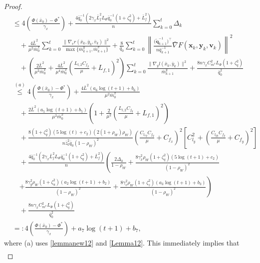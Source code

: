 \documentclass{article}
\theoremstyle{plain}
\theoremstyle{definition}
\theoremstyle{remark}
\begin{document}
\begin{proof}
\begin{align}
&\leq4\left(\frac{\Phi(\bar{x}_{0})-\Phi^*}{\gamma_x}\right)+\frac{4\bar{q}_{0}^{-1}(2\gamma_x \bar{L}_{f}^2L_\Phi \bar{q}_0^{-1} \left(1 +\zeta_q^2\right)+\bar{L}_f^2)}{n}\sum_{k=0}^t \Delta_k\nonumber\\
&\quad + \frac{4\bar{L}^2}{\mu^2\bar{m}^x_{0}}\sum_{k=0}^t \frac{\|\nabla_v r(\bar{x}_k, \bar{y}_k, \bar{v}_k)\|^2}{\max\{\bar{m}^y_{k+1},\bar{m}^v_{k+1}\}}+ \frac{8}{\bar{q}_{0}}\sum_{k=0}^t \left\| \frac{\big(\tilde{\mathbf{q}}_{k+1}^{-1}\big)^\top}{n\bar{q}_{k+1}^{-1}} \bar{\nabla} F(\mathbf{x}_k, \mathbf{y}_k, \mathbf{v}_k) \right\|^2 \nonumber\\
&\quad+ \left( \frac{2\bar{L}^2}{\mu^2\bar{m}^x_{0}} + \frac{4\bar{L}^2}{\mu^4\bar{m}^x_{0}} \left( \frac{L_{l,2} C_{f_y}}{\mu} + L_{f,1} \right)^2 \right)\sum_{k=0}^t \frac{\|\nabla_y l(\bar{x}_k, \bar{y}_k)\|^2}{\bar{m}^y_{k+1}}+\frac{8n\gamma_x C_{m^x}^2 L_\Phi \left(1 +\zeta_q^2\right)}{\bar{q}_0^2}\nonumber\\
&\overset{(a)}{\leq}4\left(\frac{\Phi(\bar{x}_{0})-\Phi^*}{\gamma_x}\right)+ \frac{4\bar{L}^2(a_6\log(t + 1)+b_6) }{\mu^2\bar{m}^x_{0}}\nonumber\\
&\quad+\frac{2\bar{L}^2(a_5\log(t + 1)+b_5)}{\mu^2\bar{m}^x_{0}} \left( 1 + \frac{2}{\mu^2} \left( \frac{L_{l,2} C_{f_y}}{\mu} + L_{f,1} \right)^2 \right)\nonumber\\
&\quad + \frac{8(1+\zeta_q^2)(5 \log(t) + c_2)(2(1 + \rho_W) \rho_W)}{n\bar{z}_0^2\bar{q}_0(1 - \rho_W)^2}\left(\frac{C_{l_{xy}}C_{f_y}}{\mu}\!+\!C_{f_x}\right)^2\!\left[\!C_{l_y}^2\!+\!\left(\frac{C_{l_{yy}}C_{f_y}}{\mu}+C_{f_y}\right)^2\!\right] \nonumber\\
&\quad+\frac{4\bar{q}_{0}^{-1}(2\gamma_x \bar{L}_{f}^2L_\Phi \bar{q}_0^{-1} \left(1 +\zeta_q^2\right)+\bar{L}_f^2)}{n}\left(\frac{2 \Delta_0}{1 - \rho_W} 
+ \frac{8 \gamma_x^2 \rho_W (1 + \zeta_q^2)( 5 \log(t+1) + c_2)}{(1 - \rho_W)^2}\right. \nonumber \\
&\quad \left.+ \frac{8 \gamma_y^2 \rho_W (1 + \zeta_u^2)(a_2 \log(t+1) + b_2)}{(1 - \rho_W)^2}+\frac{8 \gamma_v^2 \rho_W (1 + \zeta_z^2)(a_3 \log(t+1) + b_3)}{(1 - \rho_W)^2}\right)\nonumber\\
&\quad+ \frac{8n\gamma_x C_{m^x}^2 L_\Phi \left(1 +\zeta_q^2\right)}{\bar{q}_0^2}\nonumber\\
&=:4\left(\frac{\Phi(\bar{x}_{0})-\Phi^*}{\gamma_x}\right)+a_7\log(t+1)+b_7,\label{eq135}
\end{align}
where (a) uses \cref{lemmanew12} and \cref{Lemma12}. This immediately implies that
\begin{align}

\end{align}
\end{proof}
\end{document}
